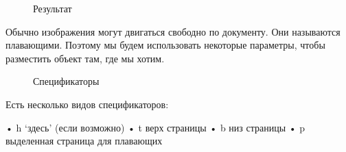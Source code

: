 \documentclass[
  english,
  russian,
  12pt,
  a4paper,
  DIV=11,
  numbers=noendperiod]{scrreprt}
\begin{document}
\begin{figure}


\caption{\label{fig-006}Результат}

\end{figure}%

Обычно изображения могут двигаться свободно по документу. Они называются
плавающими. Поэтому мы будем использовать некоторые параметры, чтобы
разместить объект там, где мы хотим.

\begin{figure}


\caption{\label{fig-007}Спецификаторы}

\end{figure}%

Есть несколько видов спецификаторов:

• h \enquote*{здесь} (если возможно) • t верх страницы • b низ страницы
• p выделенная страница для плавающих
\end{document}
